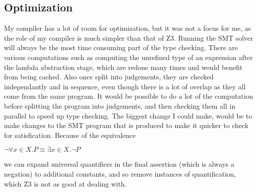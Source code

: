 \subsection{Optimization}

My compiler has a lot of room for optimization, but it was not a focus for me, as the role of my
compiler is much simpler than that of Z3.
Running the SMT solver will always be the most time consuming part of the type checking.
There are various computations such as computing the unrefined type of an expression after the lambda
abstraction stage, which are redone many times and would benefit from being cached.
Also once split into judgements, they are checked independantly and in sequence, even though there
is a lot of overlap as they all come from the same program.
It would be possible to do a lot of the computation before splitting the program into judgements,
and then checking them all in parallel to speed up type checking.
The biggest change I could make, would be to make changes to the SMT program that is produced to
make it quicker to check for satisfication.
Because of the equivalence

\begin{center}
    $\lnot \forall x \in X . P \equiv \exists x \in X . \lnot P$
\end{center}

we can expand universal quantifiers in the final assertion (which is always a negation) to additional
constants, and so remove instances of quantification, which Z3 is not as good at dealing with.
